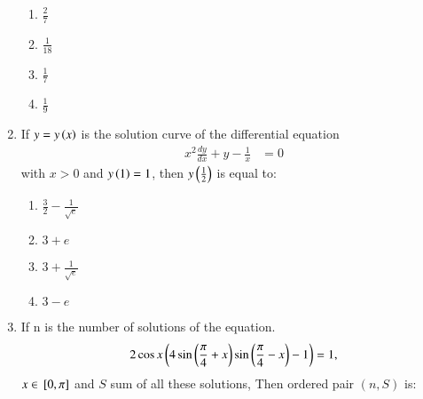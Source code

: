 \documentclass[journal,12pt,onecolumn]{IEEEtran}
\theoremstyle{remark}
\begin{document}
\begin{enumerate}
\begin{multicols}{2}

\begin{enumerate}

    \item $\frac{2}{7}$ \\
    \item $\frac{1}{18}$ 
    \item $\frac{1}{7}$ \\
    \item $\frac{1}{9}$
\end{enumerate}
\end{multicols}

\item If $y = y\left(x\right)$ is the solution curve of the differential equation
\begin{align*}
x^{2} \frac{dy}{dx} + y - \frac{1}{x} &= 0
\end{align*}
with $x>0$ and $y\left(1\right)= 1$, then $y\left(\frac{1}{2}\right)$ is equal to:
\begin{multicols}{2}
\begin{enumerate}
    \item $\frac{3}{2}-\frac{1}{\sqrt{e}}$\\
  
    \item $3 + e$
     \item $3 + \frac{1}{\sqrt{e}}$ \\
    \item $3 - e$
\end{enumerate}
\end{multicols}
\item If n is the number of solutions of the equation.\\
\begin{align*}
2 \cos{x}\left(4\sin{\ensuremath{\left(\frac{\pi}{4} + x\right)}}\sin{\ensuremath{\left(\frac{\pi}{4}-x\right)}}-1\right)&=1,\\
\end{align*} $x \in {}\left[0, \pi\right]$ and $S$ sum of all these solutions, Then ordered pair $(n, S)$ is:
\begin{multicols}{4}
\begin{enumerate}


\end{enumerate}
\end{multicols}
\end{enumerate}
\end{document}
